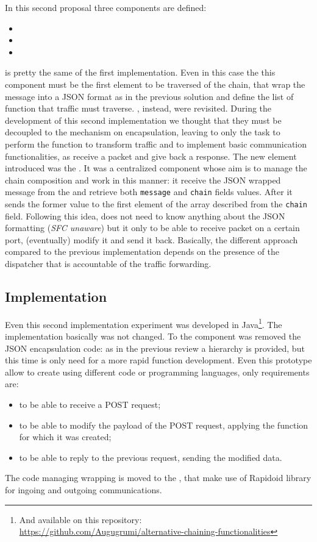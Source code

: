 In this second proposal three components are defined:
\begin{itemize}
  \item \enchainer{}
  \item \dispatcher{}
  \item \vnfs{}
\end{itemize}
\enchainer{} is pretty the same of the first implementation. Even in this case
the this component must be the first element to be traversed of the chain, that
wrap the message into a JSON format as in the previous solution and define the
list of function that traffic must traverse. \vnfs{}, instead, were revisited.
During the development of this second implementation we thought that they must
be decoupled to the mechanism on encapsulation, leaving to \vnf{} only the task
to perform the function to transform traffic and to implement basic
communication functionalities, as receive a packet and give back a response. The
new element introduced was the \dispatcher{}. It was a centralized component
whose aim is to manage the chain composition and work in this manner: it receive
the JSON wrapped message from the \enchainer{} and retrieve both
\texttt{message} and \texttt{chain} fields values. After it sends the former
value to the first element of the array described from the \texttt{chain} field.
Following this idea, \vnfs{} does not need to know anything about the JSON
formatting (\emph{SFC unaware}) but it only to be able to receive packet on a
certain port, (eventually) modify it and send it back. Basically, the different
approach compared to the previous implementation depends on the presence of the
dispatcher that is accountable of the traffic forwarding.

\subsection{Implementation}
Even this second implementation experiment was developed in Java\footnote{And
available on this repository: \\
\url{https://github.com/Augugrumi/alternative-chaining-functionalities}}. The
\enchainer{} implementation basically was not changed. To the \vnf{} component
was removed the JSON encapsulation code: as in the previous review a hierarchy
is provided, but this time is only need for a more rapid function development.
Even this prototype allow to create \vnf{} using different code or programming
languages, only requirements are:
\begin{itemize}
  \item to be able to receive a POST request;
  \item to be able to modify the payload of the POST request, applying the
  function for which it was created;
  \item to be able to reply to the previous request, sending the modified data.
\end{itemize}
The code managing wrapping is moved to the \dispatcher{}, that make use of
Rapidoid library for ingoing and outgoing communications.

